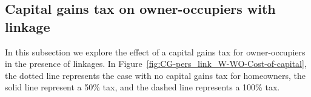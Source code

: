 \subsection{Capital gains tax on owner-occupiers  with linkage}
In this subsection we explore the effect of a capital gains tax for owner-occupiers in the presence of linkages. 
In Figure~\ref{fig:CG-pers_link_W-WO-Cost-of-capital}, the dotted line represents the case with no capital gains tax for homeowners, the solid line represent a 50\% tax, and the dashed line represents a 100\% tax.
\begin{figure}[h!tb]   
    \centering
\end{figure}
